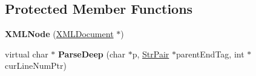 \subsection*{Protected Member Functions}
\begin{DoxyCompactItemize}
\item 
\mbox{\label{classtinyxml2_1_1XMLNode_a29868df6ca383d574f584dfdd15105b6}} 
{\bfseries X\+M\+L\+Node} (\mbox{\hyperlink{classtinyxml2_1_1XMLDocument}{X\+M\+L\+Document}} $\ast$)
\item 
\mbox{\label{classtinyxml2_1_1XMLNode_a5cef2b1dacd8c6bc61373c9221fe01a3}} 
virtual char $\ast$ {\bfseries Parse\+Deep} (char $\ast$p, \mbox{\hyperlink{classtinyxml2_1_1StrPair}{Str\+Pair}} $\ast$parent\+End\+Tag, int $\ast$cur\+Line\+Num\+Ptr)
\end{DoxyCompactItemize}
